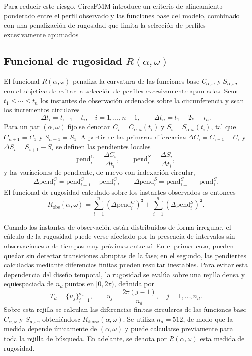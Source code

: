 \documentclass[12pt, a4paper]{report}
\begin{document}
Para reducir este riesgo, CircaFMM introduce un criterio de alineamiento ponderado entre el perfil observado y las funciones base del modelo, combinado con una penalización de rugosidad que limita la selección de perfiles excesivamente apuntados.

\subsection{Funcional de rugosidad \(R(\alpha,\omega)\)}

El funcional \(R(\alpha,\omega)\) penaliza la curvatura de las funciones base \(C_{\alpha,\omega}\) y \(S_{\alpha,\omega}\), con el objetivo de evitar la selección de perfiles excesivamente apuntados. Sean \(t_1\leq\cdots\leq t_n\) los instantes de observación ordenados sobre la circunferencia y sean los incrementos circulares
\[
\Delta t_i=t_{i+1}-t_i,\quad i=1,\ldots,n-1,
\qquad
\Delta t_n=t_1+2\pi-t_n .
\]
Para un par \((\alpha,\omega)\) fijo se denotan \(C_i=C_{\alpha,\omega}(t_i)\) y \(S_i=S_{\alpha,\omega}(t_i)\), tal que \(C_{n+1}=C_1\) y \(S_{n+1}=S_1\). A partir de las primeras diferencias \(\Delta C_i=C_{i+1}-C_i\) y \(\Delta S_i=S_{i+1}-S_i\) se definen las pendientes locales
\[
\mathrm{pend}^{C}_i=\frac{\Delta C_i}{\Delta t_i},
\qquad
\mathrm{pend}^{S}_i=\frac{\Delta S_i}{\Delta t_i},
\]
y las variaciones de pendiente, de nuevo con indexación circular,
\[
\Delta\mathrm{pend}^{C}_i=\mathrm{pend}^{C}_{i+1}-\mathrm{pend}^{C}_i,
\qquad
\Delta\mathrm{pend}^{S}_i=\mathrm{pend}^{S}_{i+1}-\mathrm{pend}^{S}_i .
\]
El funcional de rugosidad calculado sobre los instantes observados es entonces
\[
R_{\mathrm{obs}}(\alpha,\omega)=
\sum_{i=1}^{n}\left(\Delta\mathrm{pend}^{C}_i\right)^{2}
+
\sum_{i=1}^{n}\left(\Delta\mathrm{pend}^{S}_i\right)^{2}.
\]

Cuando los instantes de observación están distribuidos de forma irregular, el cálculo de la rugosidad puede verse afectado por la presencia de intervalos sin observaciones o de tiempos muy próximos entre sí. En el primer caso, pueden quedar sin detectar transiciones abruptas de la fase; en el segundo, las pendientes calculadas mediante diferencias finitas pueden resultar inestables.
Para evitar esta dependencia del diseño temporal, la rugosidad se evalúa sobre una rejilla densa y equiespaciada de \(n_d\) puntos en \([0,2\pi)\), definida por
\[
T_d=\{u_j\}_{j=1}^{n_d},\qquad
u_j=\frac{2\pi(j-1)}{n_d},\quad j=1,\ldots,n_d.
\]
Sobre esta rejilla se calculan las diferencias finitas circulares de las funciones base \(C_{\alpha,\omega}\) y \(S_{\alpha,\omega}\), obteniéndose \(R_{\mathrm{dense}}(\alpha,\omega)\). Se utiliza \(n_d=512\), de modo que la medida depende únicamente de \((\alpha,\omega)\) y puede calcularse previamente para toda la rejilla de búsqueda. En adelante, se denota por \(R(\alpha,\omega)\) esta medida de rugosidad.
\end{document}

